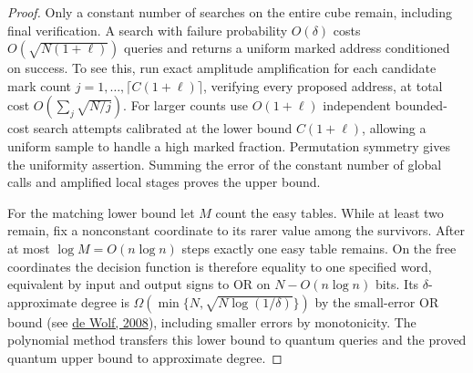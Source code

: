 \begin{proof}
Only a constant number of searches on the entire cube remain, including final verification. A search with failure probability $O(\delta)$ costs $O(\sqrt{N(1+\ell)})$ queries and returns a uniform marked address conditioned on success. To see this, run exact amplitude amplification for each candidate mark count $j=1,\ldots,\lceil C(1+\ell)\rceil$, verifying every proposed address, at total cost $O(\sum_j\sqrt{N/j})$. For larger counts use $O(1+\ell)$ independent bounded-cost search attempts calibrated at the lower bound $C(1+\ell)$, allowing a uniform sample to handle a high marked fraction. Permutation symmetry gives the uniformity assertion. Summing the error of the constant number of global calls and amplified local stages proves the upper bound.

For the matching lower bound let $M$ count the easy tables. While at least two remain, fix a nonconstant coordinate to its rarer value among the survivors. After at most $\log M=O(n\log n)$ steps exactly one easy table remains. On the free coordinates the decision function is therefore equality to one specified word, equivalent by input and output signs to OR on $N-O(n\log n)$ bits. Its $\delta$-approximate degree is $\Omega(\min\{N,\sqrt{N\log(1/\delta)}\})$ by the small-error OR bound (see \href{https://arxiv.org/abs/0802.1816}{de Wolf, 2008}), including smaller errors by monotonicity. The polynomial method transfers this lower bound to quantum queries and the proved quantum upper bound to approximate degree.
\end{proof}
